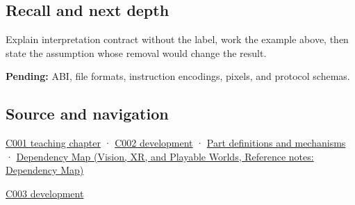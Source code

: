 \subsection{Recall and next depth}\label{appendix-f414bd4ed05c-recall-and-next-depth}

\hypertarget{appendix-f414bd4ed05c-recall-and-next-depth}{}

Explain interpretation contract without the label, work the example above, then state the assumption whose removal would change the result.

\textbf{Pending:} ABI, file formats, instruction encodings, pixels, and protocol schemas.

\subsection{Source and navigation}\label{appendix-f414bd4ed05c-source-and-navigation}

\hypertarget{appendix-f414bd4ed05c-source-and-navigation}{}

\hyperref[01-foundations-i-ch001-from-a-signal-to-an-interpretation]{C001 teaching chapter} · \hyperref[01-foundations-i-ch001-arithmetic-becomes-a-policy]{C002 development} · \hyperref[appendix-fd090d982a15]{Part definitions and mechanisms} · \href{../07-Vision-XR-and-Playable-Worlds/main.pdf\#nameddest=appendix-4ad47bdd269a}{Dependency Map (Vision, XR, and Playable Worlds, Reference notes: Dependency Map)}

\hyperref[01-foundations-i-ch002-where-the-bytes-live]{C003 development}
